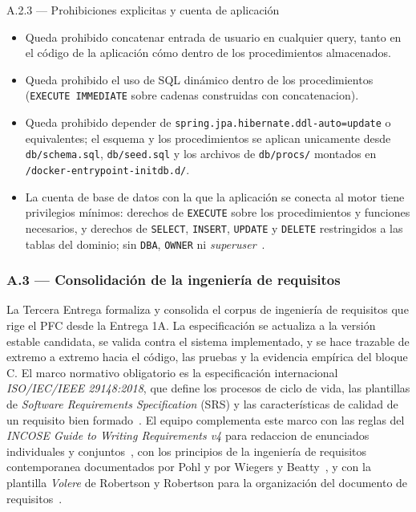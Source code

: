 \documentclass[11pt,a4paper]{article}
\begin{document}
\begin{cajarepo}{A.2.3 --- Prohibiciones explicitas y cuenta de aplicaci\'{o}n}
    \begin{itemize}
        \item Queda prohibido concatenar entrada de usuario en cualquier query, tanto en el c\'{o}digo de la aplicaci\'{o}n c\'{o}mo dentro de los procedimientos almacenados.
        \item Queda prohibido el uso de SQL din\'{a}mico dentro de los procedimientos (\texttt{EXECUTE IMMEDIATE} sobre cadenas construidas con concatenacion).
        \item Queda prohibido depender de \texttt{spring.jpa.hibernate.ddl-auto=update} o equivalentes; el esquema y los procedimientos se aplican unicamente desde \texttt{db/schema.sql}, \texttt{db/seed.sql} y los archivos de \texttt{db/procs/} montados en \texttt{/docker-entrypoint-initdb.d/}.
        \item La cuenta de base de datos con la que la aplicaci\'{o}n se conecta al motor tiene privilegios m\'{i}nimos: derechos de \texttt{EXECUTE} sobre los procedimientos y funciones necesarios, y derechos de \texttt{SELECT}, \texttt{INSERT}, \texttt{UPDATE} y \texttt{DELETE} restringidos a las tablas del dominio; sin \texttt{DBA}, \texttt{OWNER} ni \emph{superuser}~\cite{owaspsqlicheatsheet}.
    \end{itemize}
\end{cajarepo}

\subsubsection*{A.3 --- Consolidaci\'{o}n de la ingenier\'{i}a de requisitos}

La Tercera Entrega formaliza y consolida el corpus de ingenier\'{i}a de requisitos que rige el PFC desde la Entrega 1A. La especificaci\'{o}n se actualiza a la versi\'{o}n estable candidata, se valida contra el sistema implementado, y se hace trazable de extremo a extremo hacia el c\'{o}digo, las pruebas y la evidencia emp\'{i}rica del bloque C. El marco normativo obligatorio es la especificaci\'{o}n internacional \emph{ISO/IEC/IEEE 29148:2018}, que define los procesos de ciclo de vida, las plantillas de \emph{Software Requirements Specification} (SRS) y las caracter\'{i}sticas de calidad de un requisito bien formado~\cite{iso29148}. El equipo complementa este marco con las reglas del \emph{INCOSE Guide to Writing Requirements v4} para redaccion de enunciados individuales y conjuntos~\cite{incose2023requirements}, con los principios de la ingenier\'{i}a de requisitos contemporanea documentados por Pohl y por Wiegers y Beatty~\cite{pohl2010requirements,wiegers2013software}, y con la plantilla \emph{Volere} de Robertson y Robertson para la organizaci\'{o}n del documento de requisitos~\cite{robertson2012mastering}.
\end{document}
